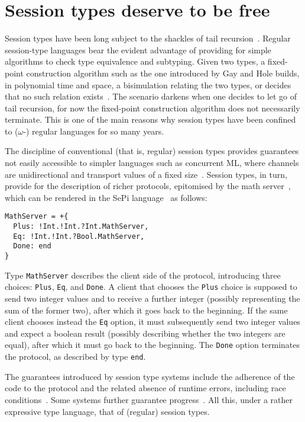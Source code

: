\section{Session types deserve to be free}

Session types have been long subject to the shackles of tail
recursion~\cite{DBLP:conf/concur/Honda93,DBLP:conf/esop/HondaVK98}. Regular
session-type languages bear the evident advantage of providing for
simple algorithms to check type equivalence and subtyping. Given two
types, a fixed-point construction algorithm such as the one introduced
by Gay and Hole builds, in polynomial time and space, a bisimulation
relating the two types, or decides that no such relation
exists~\cite{DBLP:journals/acta/GayH05}. The scenario darkens when one
decides to let go of tail recursion, for now the fixed-point
construction algorithm does not necessarily terminate.
%
This is one of the main reasons why session types have been confined
to ($\omega$-) regular languages for so many years.

The discipline of conventional (that is, regular) session types
provides guarantees not easily accessible to simpler languages such as
concurrent ML, where channels are unidirectional and transport values
of a fixed size~\cite{DBLP:conf/mcmaster/Reppy93}. Session types, in
turn, provide for the description of richer protocols, epitomised by
the math server~\cite{DBLP:journals/acta/GayH05}, which can be
rendered in the SePi language~\cite{DBLP:conf/sefm/FrancoV13} as
follows:
%
\begin{lstlisting}[morekeywords=end]
MathServer = +{
  Plus: !Int.!Int.?Int.MathServer,
  Eq: !Int.!Int.?Bool.MathServer,
  Done: end
}
\end{lstlisting}

Type \lstinline|MathServer| describes the client side of the protocol,
introducing three choices: \lstinline|Plus|, \lstinline|Eq|, and
\lstinline|Done|. A client that chooses the \lstinline|Plus| choice is
supposed to send two integer values and to receive a further integer
(possibly representing the sum of the former two), after which it goes
back to the beginning. If the same client chooses instead the
\lstinline|Eq| option, it must subsequently send two integer values
and expect a boolean result (possibly describing whether the two
integers are equal), after which it must go back to the beginning.
The \lstinline|Done| option terminates the protocol, as described by
type \lstinline[morekeywords=end]|end|.

The guarantees introduced by session type systems include the
adherence of the code to the protocol and the related absence of
runtime errors, including race
conditions~\cite{DBLP:conf/esop/HondaVK98}. Some systems further
guarantee progress~\cite{DBLP:conf/concur/CairesP10}. All this, under
a rather expressive type language, that of (regular) session types.

